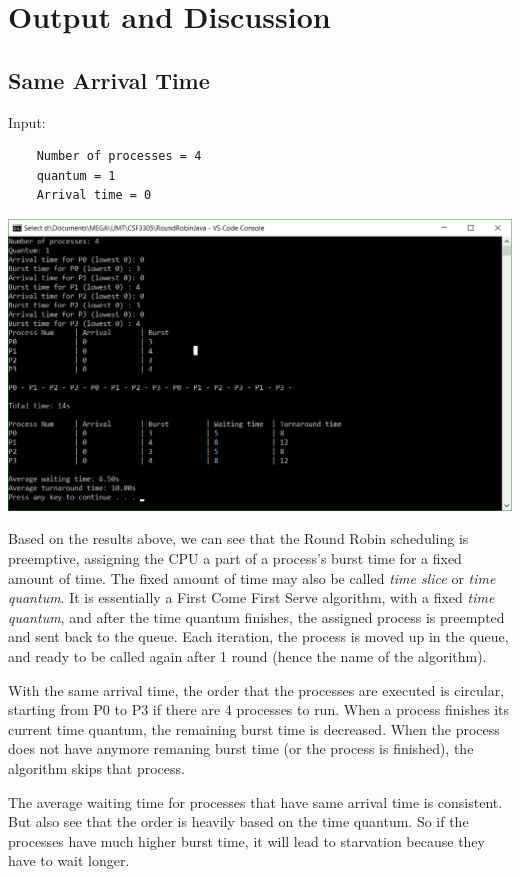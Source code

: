 \documentclass[12pt]{article}
\begin{document}
\newpage
\section{Output and Discussion}

\subsection{Same Arrival Time}

Input:

\begin{verbatim}
	Number of processes = 4
	quantum = 1
	Arrival time = 0
\end{verbatim}

\includegraphics[scale = 0.5]{arrivaltime0_output.png}

Based on the results above, we can see that the Round Robin scheduling is
preemptive, assigning the CPU a part of a process's burst time for a fixed
amount of time. The fixed amount of time may also be called \textit{time
slice} or \textit{time quantum}. It is essentially a First Come First Serve
algorithm, with a fixed \textit{time quantum}, and after the time quantum
finishes, the assigned process is preempted and sent back to the queue. Each
iteration, the process is moved up in the queue, and ready to be called again
after 1 round (hence the name of the algorithm).

With the same arrival time, the order that the processes are executed is
circular, starting from P0 to P3 if there are 4 processes to run. When a process
finishes its current time quantum, the remaining burst time is decreased. When
the process does not have anymore remaning burst time (or the process is
finished), the algorithm skips that process.

The average waiting time for processes that have same arrival time is
consistent. But also see that the order is heavily based on the time
quantum. So if the processes have much higher burst time, it will lead to
starvation because they have to wait longer.
\end{document}
